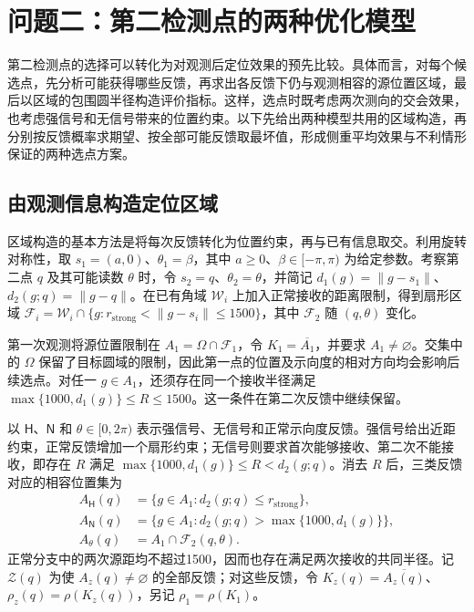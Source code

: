 \section{问题二：第二检测点的两种优化模型}

第二检测点的选择可以转化为对观测后定位效果的预先比较。具体而言，对每个候选点，先分析可能获得哪些反馈，再求出各反馈下仍与观测相容的源位置区域，最后以区域的包围圆半径构造评价指标。这样，选点时既考虑两次测向的交会效果，也考虑强信号和无信号带来的位置约束。以下先给出两种模型共用的区域构造，再分别按反馈概率求期望、按全部可能反馈取最坏值，形成侧重平均效果与不利情形保证的两种选点方案。

\subsection{由观测信息构造定位区域}

区域构造的基本方法是将每次反馈转化为位置约束，再与已有信息取交。利用旋转对称性，取 \(s_1=(a,0)\)、\(\theta_1=\beta\)，其中 \(a\ge0\)、\(\beta\in[-\pi,\pi)\) 为给定参数。考察第二点 \(q\) 及其可能读数 \(\theta\) 时，令 \(s_2=q\)、\(\theta_2=\theta\)，并简记 \(d_1(g)=\|g-s_1\|\)、\(d_2(g;q)=\|g-q\|\)。在已有角域 \(\mathcal W_i\) 上加入正常接收的距离限制，得到扇形区域 \(\mathcal F_i=\mathcal W_i\cap\{g:r_{\mathrm{strong}}<\|g-s_i\|\le1500\}\)，其中 \(\mathcal F_2\) 随 \((q,\theta)\) 变化。

第一次观测将源位置限制在 \(A_1=\Omega\cap\mathcal F_1\)，令 \(K_1=\overline{A_1}\)，并要求 \(A_1\ne\varnothing\)。交集中的 \(\Omega\) 保留了目标圆域的限制，因此第一点的位置及示向度的相对方向均会影响后续选点。对任一 \(g\in A_1\)，还须存在同一个接收半径满足 \(\max\{1000,d_1(g)\}\le R\le1500\)。这一条件在第二次反馈中继续保留。

以 \(\mathsf H\)、\(\mathsf N\) 和 \(\theta\in[0,2\pi)\) 表示强信号、无信号和正常示向度反馈。强信号给出近距约束，正常反馈增加一个扇形约束；无信号则要求首次能够接收、第二次不能接收，即存在 \(R\) 满足 \(\max\{1000,d_1(g)\}\le R<d_2(g;q)\)。消去 \(R\) 后，三类反馈对应的相容位置集为
\begin{equation}
\begin{aligned}
A_{\mathsf H}(q)&=\{g\in A_1:d_2(g;q)\le r_{\mathrm{strong}}\},\\
A_{\mathsf N}(q)&=\{g\in A_1:d_2(g;q)>\max\{1000,d_1(g)\}\},\\
A_\theta(q)&=A_1\cap\mathcal F_2(q,\theta).
\end{aligned}
\label{eq:q2-pair-regions}
\end{equation}
正常分支中的两次源距均不超过1500，因而也存在满足两次接收的共同半径。记 \(\mathcal Z(q)\) 为使 \(A_z(q)\ne\varnothing\) 的全部反馈；对这些反馈，令 \(K_z(q)=\overline{A_z(q)}\)、\(\rho_z(q)=\rho(K_z(q))\)，另记 \(\rho_1=\rho(K_1)\)。

